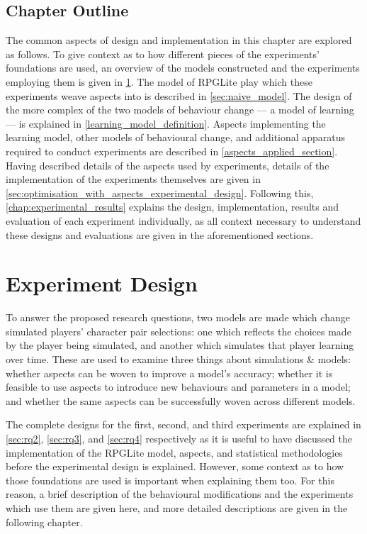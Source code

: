 \subsection{Chapter Outline}

The common aspects of design and implementation in this chapter are explored as
follows. To give context as to how different pieces of the experiments'
foundations are used, an overview of the models constructed and the experiments
employing them is given in \cref{experiment_design_sec_models_and_experiments}.
The model of RPGLite play which these experiments weave aspects into is
described in \cref{sec:naive_model}. The design of the more complex of the two
models of behaviour change --- a model of learning --- is explained in
\cref{learning_model_definition}. Aspects implementing the learning model, other
models of behavioural change, and additional apparatus required to conduct
experiments are described in \cref{aspects_applied_section}. Having described
details of the aspects used by experiments, details of the implementation of the
experiments themselves are given in
\cref{sec:optimisation_with_aspects_experimental_design}. Following this,
\cref{chap:experimental_results} explains the design, implementation, results
and evaluation of each experiment individually, as all context necessary to
understand these designs and evaluations are given in the aforementioned
sections.

\section{Experiment Design}
\label{experiment_design_sec_models_and_experiments}

To answer the proposed research questions, two models are made which change
simulated players' character pair selections: one which reflects the choices
made by the player being simulated, and another which simulates that player
learning over time. These are used to examine three things about
\aspectoriented{} simulations \& models: whether aspects can be woven to improve
a model's accuracy; whether it is feasible to use aspects to introduce new
behaviours and parameters in a model; and whether the same aspects can be
successfully woven across different models.


The complete designs for the first, second, and third experiments are explained
in \cref{sec:rq2}, \cref{sec:rq3}, and \cref{sec:rq4} respectively as it is
useful to have discussed the implementation of the RPGLite model, aspects, and
statistical methodologies before the experimental design is explained. However,
some context as to how those foundations are used is important when explaining
them too. For this reason, a brief description of the behavioural modifications
and the experiments which use them are given here, and more detailed
descriptions are given in the following chapter.

